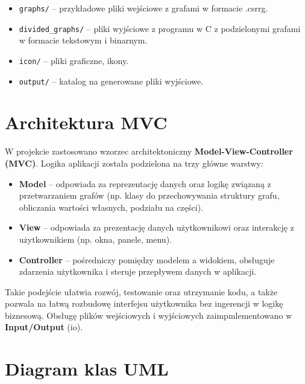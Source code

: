 \documentclass{article}
\begin{document}
\begin{itemize}
        \begin{itemize}
            \item \texttt{graphs/} -- przykładowe pliki wejściowe z grafami w formacie .csrrg.
            \item \texttt{divided\_graphs/} -- pliki wyjściowe z programu w C z podzielonymi grafami w formacie tekstowym i binarnym.
            \item \texttt{icon/} -- pliki graficzne, ikony.
            \item \texttt{output/} -- katalog na generowane pliki wyjściowe.
        \end{itemize}
    \end{itemize}



\section{Architektura MVC}

W projekcie zastosowano wzorzec architektoniczny \textbf{Model-View-Controller (MVC)}.  
Logika aplikacji została podzielona na trzy główne warstwy:

\begin{itemize}
    \item \textbf{Model} -- odpowiada za reprezentację danych oraz logikę związaną z przetwarzaniem grafów (np. klasy do przechowywania struktury grafu, obliczania wartości własnych, podziału na części).
    \item \textbf{View} -- odpowiada za prezentację danych użytkownikowi oraz interakcję z użytkownikiem (np. okna, panele, menu).
    \item \textbf{Controller} -- pośredniczy pomiędzy modelem a widokiem, obsługuje zdarzenia użytkownika i steruje przepływem danych w aplikacji.
\end{itemize}

Takie podejście ułatwia rozwój, testowanie oraz utrzymanie kodu, a także pozwala na łatwą rozbudowę interfejsu użytkownika bez ingerencji w logikę biznesową.
Obsługę plików wejściowych i wyjściowych zaimpmlementowano w \textbf{Input/Output} (io).



\section{Diagram klas UML}
\end{document}
